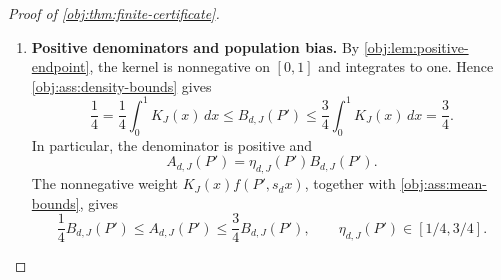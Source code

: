 \documentclass[11pt]{article}
\begin{document}
\begin{proof}[Proof of \cref{obj:thm:finite-certificate}]
\begin{enumerate}
Define the centered empirical errors on the sample and seed space by
\[
\begin{aligned}
\Delta^{\mathrm A}_{d,J}(S_n,U)
&=\widehat A_{d,J}(S_n)-A_{d,J}(P'),\\
\Delta^{\mathrm B}_{d,J}(S_n,U)
&=\widehat B_{d,J}(S_n)-B_{d,J}(P').
\end{aligned}
\]
The empirical averages are those of \cref{obj:def:ratio}. For either
\(\diamond\in\{\mathrm A,\mathrm B\}\), the population identities show that
\[
\Delta^\diamond_{d,J}
=\frac1n\sum_{i=1}^n
\left[
\xi^\diamond_{d,J}(D_i,Y_i,W_i)
-\int\xi^\diamond_{d,J}\,dP'_{\mathrm{obs}}
\right].
\]
Independence makes the cross terms between distinct centered observations vanish. Expanding the square therefore gives
\[
\begin{aligned}
\mathbb E_{P',n}\Delta^\diamond_{d,J}&=0,\\
\mathbb E_{P',n}(\Delta^\diamond_{d,J})^2
&=\frac1n\int
\left(\xi^\diamond_{d,J}
-\int\xi^\diamond_{d,J}\,dP'_{\mathrm{obs}}\right)^2
dP'_{\mathrm{obs}}\\
&=\frac1n\left[
\int(\xi^\diamond_{d,J})^2\,dP'_{\mathrm{obs}}
-\left(\int\xi^\diamond_{d,J}\,dP'_{\mathrm{obs}}\right)^2
\right]\\
&\le\frac{V_J(\sigma)}n.
\end{aligned}
\]
These errors are square integrable. Integrating the independent seed contributes a factor one, since the averages depend on the sample. The same mean calculation proves
\[
\mathbb E_{P',n}\widehat B_{d,J}=B_{d,J}(P').
\]

\item \textbf{Positive denominators and population bias.}
By \cref{obj:lem:positive-endpoint}, the kernel is nonnegative on \([0,1]\) and integrates to one. Hence \cref{obj:ass:density-bounds} gives
\[
\frac14
=\frac14\int_0^1K_J(x)\,dx
\le B_{d,J}(P')
\le\frac34\int_0^1K_J(x)\,dx
=\frac34.
\]
In particular, the denominator is positive and
\[
A_{d,J}(P')=\eta_{d,J}(P')B_{d,J}(P').
\]
The nonnegative weight \(K_J(x)f(P',s_dx)\), together with
\cref{obj:ass:mean-bounds}, gives
\[
\frac14B_{d,J}(P')
\le A_{d,J}(P')
\le\frac34B_{d,J}(P'),
\qquad
\eta_{d,J}(P')\in[1/4,3/4].
\]


\end{enumerate}
\end{proof}
\end{document}
